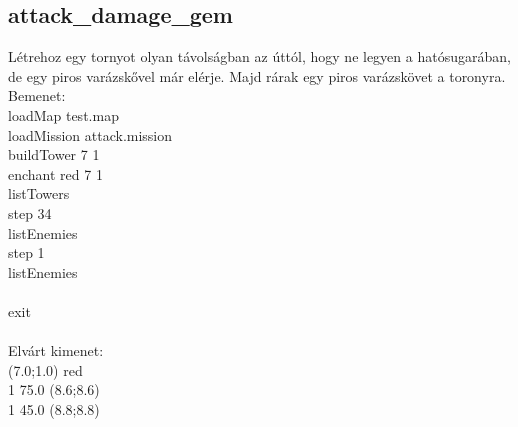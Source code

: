 \subsection{attack\_damage\_gem}
Létrehoz egy tornyot olyan távolságban az úttól, hogy ne legyen a hatósugarában, de egy piros varázskővel már elérje.
Majd rárak egy piros varázskövet a toronyra.\\
Bemenet:\\
loadMap test.map\\
loadMission attack.mission\\
buildTower 7 1\\
enchant red 7 1\\
listTowers\\
step 34\\
listEnemies\\
step 1\\
listEnemies\\
\\
exit\\ \\
Elvárt kimenet:\\
(7.0;1.0) red \\
1 75.0 (8.6;8.6) \\
1 45.0 (8.8;8.8) \\
\\
